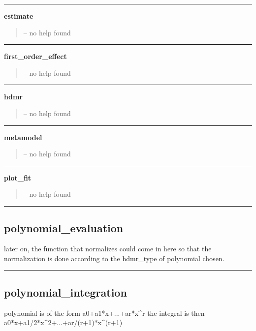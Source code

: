 \documentclass[letterpaper,10pt,english]{sphinxmanual}
\begin{document}
\bigskip\hrule{}\bigskip

\label{classes/utils/@hdmr/hdmr:estimate}
\textbf{estimate}
\begin{quote}

-- no help found
\end{quote}


\bigskip\hrule{}\bigskip

\label{classes/utils/@hdmr/hdmr:first-order-effect}
\textbf{first\_order\_effect}
\begin{quote}

-- no help found
\end{quote}


\bigskip\hrule{}\bigskip

\label{classes/utils/@hdmr/hdmr:hdmr}
\textbf{hdmr}
\begin{quote}

-- no help found
\end{quote}


\bigskip\hrule{}\bigskip

\label{classes/utils/@hdmr/hdmr:metamodel}
\textbf{metamodel}
\begin{quote}

-- no help found
\end{quote}


\bigskip\hrule{}\bigskip

\label{classes/utils/@hdmr/hdmr:plot-fit}
\textbf{plot\_fit}
\begin{quote}

-- no help found
\end{quote}


\bigskip\hrule{}\bigskip



\subsection{polynomial\_evaluation}
\label{classes/utils/@hdmr/hdmr:polynomial-evaluation}\label{classes/utils/@hdmr/hdmr:id1}
later on, the function that normalizes could come in here so that the
normalization is done according to the hdmr\_type of polynomial chosen.


\bigskip\hrule{}\bigskip



\subsection{polynomial\_integration}
\label{classes/utils/@hdmr/hdmr:id2}\label{classes/utils/@hdmr/hdmr:polynomial-integration}
polynomial is of the form a0+a1*x+...+ar*x\textasciicircum{}r
the integral is then a0*x+a1/2*x\textasciicircum{}2+...+ar/(r+1)*x\textasciicircum{}(r+1)
\end{document}
